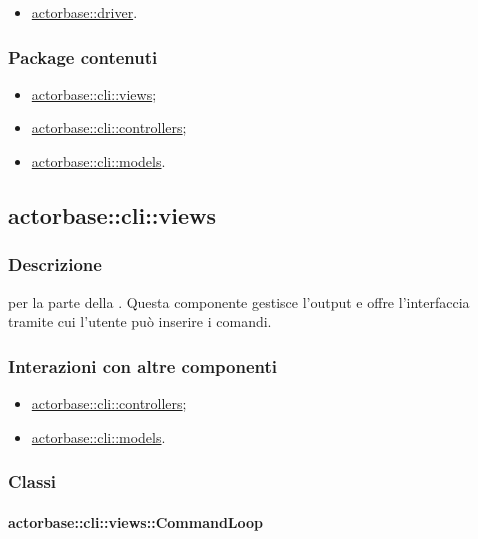 \documentclass{scalatekids-article}
\begin{document}
\begin{itemize}
\item \hyperref[sec:actorbase::driver]{actorbase::driver}.
\end{itemize}

\subsubsection{Package contenuti}

\begin{itemize}
\item \hyperref[sec:actorbase::cli::views]{actorbase::cli::views};
\item \hyperref[sec:actorbase::cli::controllers]{actorbase::cli::controllers};
\item \hyperref[sec:actorbase::cli::models]{actorbase::cli::models}.
\end{itemize}

\subsection{actorbase::cli::views}
\label{sec:actorbase::cli::views}

\subsubsection{Descrizione}

 per la parte  della . Questa componente
gestisce l'output e offre l'interfaccia tramite cui l'utente può inserire i
comandi.

\subsubsection{Interazioni con altre componenti}

\begin{itemize}
\item \hyperref[sec:actorbase::cli::controllers]{actorbase::cli::controllers};
\item \hyperref[sec:actorbase::cli::models]{actorbase::cli::models}.
\end{itemize}

\subsubsection{Classi}

\paragraph{actorbase::cli::views::CommandLoop}
\label{sec:actorbase::cli::views::CommandLoop}
\end{document}
